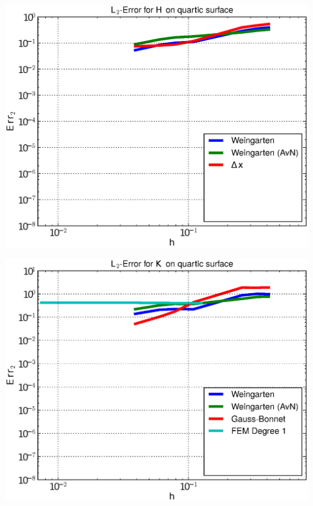 \documentclass{beamer}
\begin{document}
\begin{frame}
\begin{overprint}
\begin{minipage}[t]{0.49\textwidth}
            \centering\includegraphics[width=\textwidth]{bilder/Curvature/heineB/ErrHL2_3.eps}
          \end{minipage}
          \begin{minipage}[t]{0.49\textwidth}
            \centering\includegraphics[width=\textwidth]{bilder/Curvature/heineB/ErrKL2_4.eps}
          \end{minipage}\hfill
          \begin{minipage}[t]{0.49\textwidth}

\end{minipage}
\end{overprint}
\end{frame}
\end{document}
